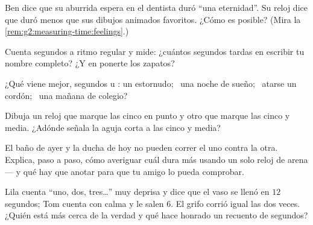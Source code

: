 \begin{exercise}[$\star$]\label{exo:g2:measuring-time:5}
Ben dice que su aburrida espera en el dentista duró ``una eternidad''.
Su reloj dice que duró menos que sus dibujos animados favoritos. ¿Cómo
es posible? (Mira la \cref{rem:g2:measuring-time:feelings}.)
\end{exercise}

\begin{exercise}[$\star$]\label{exo:g2:measuring-time:6}
Cuenta segundos a ritmo regular y mide: ¿cuántos segundos tardas en
escribir tu nombre completo? ¿Y en ponerte los zapatos?
\end{exercise}

\begin{exercise}[$\star$]\label{exo:g2:measuring-time:7}
¿Qué  viene mejor, segundos u : un estornudo; \ una
noche de sueño; \ atarse un cordón; \ una mañana de colegio?
\end{exercise}

\begin{exercise}[$\star$]\label{exo:g2:measuring-time:8}
Dibuja un reloj que marque las cinco en punto y otro que marque las
cinco y media. ¿Adónde señala la aguja corta a las cinco y media?
\end{exercise}

\begin{exercise}[$\star\star$]\label{exo:g2:measuring-time:9}
El baño de ayer y la ducha de hoy no pueden correr el uno contra la
otra. Explica, paso a paso, cómo averiguar cuál dura más usando un
solo reloj de arena --- y qué hay que anotar para que tu amigo lo
pueda comprobar.
\end{exercise}

\begin{exercise}[$\star\star$]\label{exo:g2:measuring-time:10}
Lila cuenta ``uno, dos, tres\dots'' muy deprisa y dice que el vaso se
llenó en $12$ segundos; Tom cuenta con calma y le salen $6$. El grifo
corrió igual las dos veces. ¿Quién está más cerca de la verdad y qué
hace honrado un recuento de segundos?
\end{exercise}
